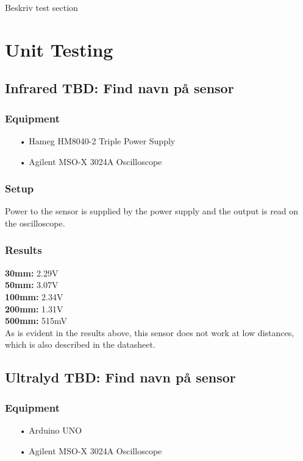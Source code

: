 Beskriv test section

\section{Unit Testing}

\subsection{Infrared TBD: Find navn på sensor}


\subsubsection{Equipment}
\begin{enumerate}
    \item[•]Hameg HM8040-2 Triple Power Supply
    \item[•]Agilent MSO-X 3024A Oscilloscope    
\end{enumerate}

\subsubsection{Setup}
Power to the sensor is supplied by the power supply and the output is read on the oscilloscope.

\subsubsection{Results}
\textbf{30mm:}  2.29V\\
\textbf{50mm:}  3.07V\\
\textbf{100mm:} 2.34V\\
\textbf{200mm:} 1.31V\\
\textbf{500mm:} 515mV\\

As is evident in the results above, this sensor does not work at low distances, which is also described in the datasheet.

\subsection{Ultralyd TBD: Find navn på sensor}


\subsubsection{Equipment}
\begin{enumerate}
    \item[•]Arduino UNO
    \item[•]Agilent MSO-X 3024A Oscilloscope    
\end{enumerate}

